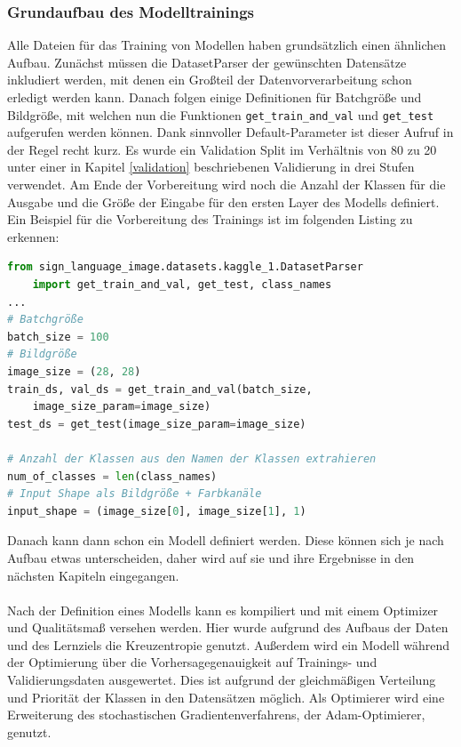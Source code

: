 \documentclass[11pt,bibliography=totocnumbered]{scrartcl}
\begin{document}
\subsubsection{Grundaufbau des Modelltrainings}
\label{training}
Alle Dateien für das Training von Modellen haben grundsätzlich einen ähnlichen Aufbau. Zunächst müssen die DatasetParser der gewünschten Datensätze inkludiert werden, mit denen ein Großteil der Datenvorverarbeitung schon erledigt werden kann. Danach folgen einige Definitionen für Batchgröße und Bildgröße, mit welchen nun die Funktionen \lstinline[language=pythoninline]|get_train_and_val| und \lstinline[language=pythoninline]|get_test| aufgerufen werden können. Dank sinnvoller Default-Parameter ist dieser Aufruf in der Regel recht kurz. Es wurde ein Validation Split im Verhältnis von 80 zu 20 unter einer in Kapitel \ref{validation} beschriebenen Validierung in drei Stufen verwendet. Am Ende der Vorbereitung wird noch die Anzahl der Klassen für die Ausgabe und die Größe der Eingabe für den ersten Layer des Modells definiert. Ein Beispiel für die Vorbereitung des Trainings ist im folgenden Listing zu erkennen:
\begin{lstlisting}[language=python,firstnumber=1,caption={Beispielhafte Vorbereitung für das Training},label=lst:pre_train]
from sign_language_image.datasets.kaggle_1.DatasetParser
	import get_train_and_val, get_test, class_names 
...
# Batchgröße
batch_size = 100
# Bildgröße
image_size = (28, 28)
train_ds, val_ds = get_train_and_val(batch_size, 
	image_size_param=image_size)
test_ds = get_test(image_size_param=image_size)

# Anzahl der Klassen aus den Namen der Klassen extrahieren
num_of_classes = len(class_names)
# Input Shape als Bildgröße + Farbkanäle
input_shape = (image_size[0], image_size[1], 1)
\end{lstlisting}
Danach kann dann schon ein Modell definiert werden. Diese können sich je nach Aufbau etwas unterscheiden, daher wird auf sie und ihre Ergebnisse in den nächsten Kapiteln eingegangen.
\\\\
Nach der Definition eines Modells kann es kompiliert und mit einem Optimizer und Qualitätsmaß versehen werden. Hier wurde aufgrund des Aufbaus der Daten und des Lernziels die Kreuzentropie genutzt. Außerdem wird ein Modell während der Optimierung über die Vorhersagegenauigkeit auf Trainings- und Validierungsdaten ausgewertet. Dies ist aufgrund der gleichmäßigen Verteilung und Priorität der Klassen in den Datensätzen möglich. Als Optimierer wird eine Erweiterung des stochastischen Gradientenverfahrens, der Adam-Optimierer, genutzt.
\end{document}
